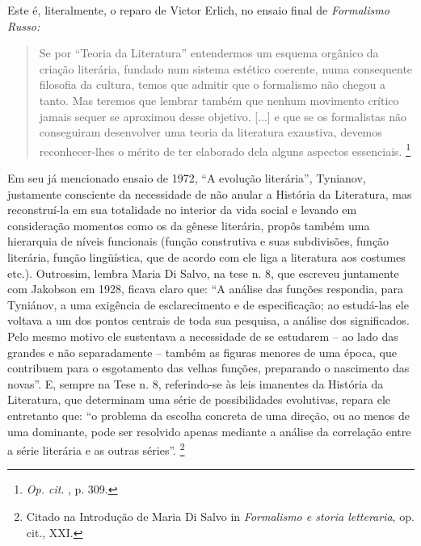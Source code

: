 Este é, literalmente, o reparo de Victor Erlich, no ensaio final de
\emph{Formalismo Russo:}

\begin{quote}
Se por ``Teoria da Literatura'' entendermos um esquema orgânico da
criação literária, fundado num sistema estético coerente, numa
consequente filosofia da cultura, temos que admitir que o formalismo não
chegou a tanto. Mas teremos que lembrar também que nenhum movimento
crítico jamais sequer se aproximou desse objetivo. {[}...{]} e que se os
formalistas não conseguiram desenvolver uma teoria da literatura
exaustiva, devemos reconhecer-lhes o mérito de ter elaborado dela alguns
aspectos essenciais. \footnote{\emph{Op. cit}. , p. 309.}
\end{quote}

Em seu já mencionado ensaio de 1972, ``A evolução literária'', Tynianov,
justamente consciente da necessidade de não anular a História da
Literatura, mas reconstruí-la em sua totalidade no interior da vida
social e levando em consideração momentos como os da gênese literária,
propôs também uma hierarquia de níveis funcionais (função construtiva e
suas subdivisões, função literária, função lingüística, que de acordo
com ele liga a literatura aos costumes etc.). Outrossim, lembra Maria Di
Salvo, na tese n. 8, que escreveu juntamente com Jakobson em 1928,
ficava claro que: ``A análise das funções respondia, para Tyniánov, a
uma exigência de esclarecimento e de especificação; ao estudá-las ele
voltava a um dos pontos centrais de toda sua pesquisa, a análise dos
significados. Pelo mesmo motivo ele sustentava a necessidade de se
estudarem -- ao lado das grandes e não separadamente -- também as
figuras menores de uma época, que contribuem para o esgotamento das
velhas funções, preparando o nascimento das novas''. E, sempre na Tese
n. 8, referindo-se às leis imanentes da História da Literatura, que
determinam uma série de possibilidades evolutivas, repara ele entretanto
que: ``o problema da escolha concreta de uma direção, ou ao menos de uma
dominante, pode ser resolvido apenas mediante a análise da correlação
entre a série literária e as outras séries''. \footnote{Citado na
  Introdução de Maria Di Salvo in \emph{Formalismo e storia letteraria},
  op. cit., XXI.}


